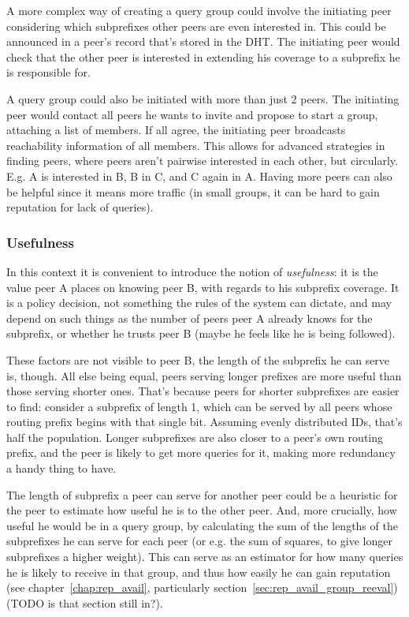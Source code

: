 A more complex way of creating a query group could involve the initiating peer
considering which subprefixes other peers are even interested in. This could be
announced in a peer's record that's stored in the DHT. The initiating peer would
check that the other peer is interested in extending his coverage to a subprefix
he is responsible for.

A query group could also be initiated with more than just 2 peers. The
initiating peer would contact all peers he wants to invite and propose to start
a group, attaching a list of members. If all agree, the initiating peer
broadcasts reachability information of all members. This allows for advanced
strategies in finding peers, where peers aren't pairwise interested in each
other, but circularly. E.g. A is interested in B, B in C, and C again in A.
Having more peers can also be helpful since it means more traffic (in small
groups, it can be hard to gain reputation for lack of queries).

\subsubsection{Usefulness}
\label{sec:desc_usefulness}
In this context it is convenient to introduce the notion of \emph{usefulness}:
it is the value peer A places on knowing peer B, with regards to his subprefix
coverage. It is a policy decision, not something the rules of the system can
dictate, and may depend on such things as the number of peers peer A already
knows for the subprefix, or whether he trusts peer B (maybe he feels like he is
being followed).

These factors are not visible to peer B, the length of the subprefix he can
serve is, though. All else being equal, peers serving longer prefixes are more
useful than those serving shorter ones. That's because peers for shorter
subprefixes are easier to find: consider a subprefix of length 1, which can be
served by all peers whose routing prefix begins with that single bit. Assuming
evenly distributed IDs, that's half the population. Longer subprefixes are also
closer to a peer's own routing prefix, and the peer is likely to get more
queries for it, making more redundancy a handy thing to have.

The length of subprefix a peer can serve for another peer could be a heuristic
for the peer to estimate how useful he is to the other peer. And, more
crucially, how useful he would be in a query group, by calculating the sum of
the lengths of the subprefixes he can serve for each peer (or e.g. the sum of
squares, to give longer subprefixes a higher weight). This can serve as an
estimator for how many queries he is likely to receive in that group, and thus
how easily he can gain reputation (see chapter~\ref{chap:rep_avail},
particularly section~\ref{sec:rep_avail_group_reeval}) (TODO is that section
still in?).

